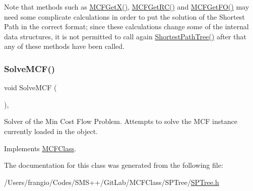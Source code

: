 Note that methods such as \mbox{\hyperlink{class_m_c_f_class_a4eb307e0707adaef99bb0e08c9e10eb8}{M\+C\+F\+Get\+X()}}, \mbox{\hyperlink{class_m_c_f_class_af027cee8179a876a4879c73820c380d1}{M\+C\+F\+Get\+R\+C()}} and \mbox{\hyperlink{class_s_p_tree_a55b9b095d557852a91b68c973236518a}{M\+C\+F\+Get\+F\+O()}} may need some complicate calculations in order to put the solution of the Shortest Path in the correct format; since these calculations change some of the internal data structures, it is not permitted to call again \mbox{\hyperlink{class_s_p_tree_a76e377a946e5a08dba5172117eaf68a8}{Shortest\+Path\+Tree()}} after that any of these methods have been called. \mbox{\label{class_s_p_tree_aea7d742cb19c17b17fb0832ea74cdb21}} 
\subsubsection{\texorpdfstring{Solve\+M\+C\+F()}{SolveMCF()}}
{\footnotesize\ttfamily void Solve\+M\+CF (\begin{DoxyParamCaption}\item[{void}]{ }\end{DoxyParamCaption})\hspace{0.3cm}{\ttfamily [override]}, {\ttfamily [virtual]}}

Solver of the Min Cost Flow Problem. Attempts to solve the M\+CF instance currently loaded in the object. 

Implements \mbox{\hyperlink{class_m_c_f_class_ac0d96429d896a2d878a5f057535ab1ee}{M\+C\+F\+Class}}.



The documentation for this class was generated from the following file\+:\begin{DoxyCompactItemize}
\item 
/\+Users/frangio/\+Codes/\+S\+M\+S++/\+Git\+Lab/\+M\+C\+F\+Class/\+S\+P\+Tree/\mbox{\hyperlink{_s_p_tree_8h}{S\+P\+Tree.\+h}}\end{DoxyCompactItemize}
